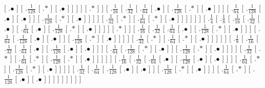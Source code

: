 \documentclass[a4paper,10pt]{article}
\begin{document}
\begin{landscape}
{ [ .$\bullet$ ]  [ .$\frac{1}{128}$  [ .$*$ ]  [ .$\bullet$ ]  ]  ]  ]  [ .$*$ ]  ]  [ .$\frac{1}{16}$  [ .$\frac{1}{32}$  [ .$\frac{1}{64}$  [ .$\bullet$ ]  [ .$\frac{1}{128}$  [ .$*$ ]  [ .$\bullet$ ]  ]  ]  [ .$\frac{1}{64}$  [ .$\frac{1}{128}$  [ .$\bullet$ ]  [ .$\bullet$ ]  ]  [ .$\frac{1}{128}$  [ .$*$ ]  [ .$\bullet$ ]  ]  ]  ]  [ .$\frac{1}{32}$  [ .$*$ ]  [ .$\frac{1}{64}$  [ .$*$ ]  [ .$\bullet$ ]  ]  ]  ]  ]  ]  [ .$\frac{1}{4}$  [ .$\frac{1}{8}$  [ .$\frac{1}{16}$  [ .$\frac{1}{32}$  [ .$\bullet$ ]  [ .$\frac{1}{64}$  [ .$\bullet$ ]  [ .$\frac{1}{128}$  [ .$*$ ]  [ .$\bullet$ ]  ]  ]  ]  [ .$*$ ]  ]  [ .$\frac{1}{16}$  [ .$\frac{1}{32}$  [ .$\frac{1}{64}$  [ .$\bullet$ ]  [ .$\frac{1}{128}$  [ .$*$ ]  [ .$\bullet$ ]  ]  ]  [ .$\frac{1}{64}$  [ .$\frac{1}{128}$  [ .$\bullet$ ]  [ .$\bullet$ ]  ]  [ .$\frac{1}{128}$  [ .$*$ ]  [ .$\bullet$ ]  ]  ]  ]  [ .$\frac{1}{32}$  [ .$*$ ]  [ .$\frac{1}{64}$  [ .$*$ ]  [ .$\bullet$ ]  ]  ]  ]  ]  [ .$\frac{1}{8}$  [ .$\frac{1}{16}$  [ .$\frac{1}{32}$  [ .$\frac{1}{64}$  [ .$\bullet$ ]  [ .$\frac{1}{128}$  [ .$\bullet$ ]  [ .$\bullet$ ]  ]  ]  [ .$\frac{1}{64}$  [ .$\frac{1}{128}$  [ .$*$ ]  [ .$\bullet$ ]  ]  [ .$\frac{1}{128}$  [ .$*$ ]  [ .$\bullet$ ]  ]  ]  ]  [ .$\frac{1}{32}$  [ .$*$ ]  [ .$\frac{1}{64}$  [ .$*$ ]  [ .$\frac{1}{128}$  [ .$*$ ]  [ .$\bullet$ ]  ]  ]  ]  ]  [ .$\frac{1}{16}$  [ .$\frac{1}{32}$  [ .$\frac{1}{64}$  [ .$\bullet$ ]  [ .$\frac{1}{128}$  [ .$\bullet$ ]  [ .$\bullet$ ]  ]  ]  [ .$\frac{1}{64}$  [ .$*$ ]  [ .$\frac{1}{128}$  [ .$*$ ]  [ .$\bullet$ ]  ]  ]  ]  [ .$\frac{1}{32}$  [ .$\frac{1}{64}$  [ .$\frac{1}{128}$  [ .$\bullet$ ]  [ .$\bullet$ ]  ]  [ .$\frac{1}{128}$  [ .$*$ ]  [ .$\bullet$ ]  ]  ]  [ .$\frac{1}{64}$  [ .$*$ ]  [ .$\frac{1}{128}$  [ .$\bullet$ ]  [ .$\bullet$ ]  ]  ]  ]  ]  ]  ]  ]  ] 
}

\end{landscape}
\end{document}
